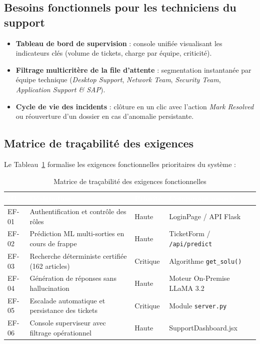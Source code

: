\documentclass[12pt, a4paper, oneside]{report}
\begin{document}
\subsection{Besoins fonctionnels pour les techniciens du support}

\begin{itemize}
  \item \textbf{Tableau de bord de supervision} : console unifiée visualisant les indicateurs clés (volume de tickets, charge par équipe, criticité).
  \item \textbf{Filtrage multicritère de la file d'attente} : segmentation instantanée par équipe technique (\textit{Desktop Support}, \textit{Network Team}, \textit{Security Team}, \textit{Application Support \& SAP}).
  \item \textbf{Cycle de vie des incidents} : clôture en un clic avec l'action \textit{Mark Resolved} ou réouverture d'un dossier en cas d'anomalie persistante.
\end{itemize}

\subsection{Matrice de traçabilité des exigences}

Le Tableau~\ref{tab:exigences} formalise les exigences fonctionnelles prioritaires du système :

\begin{table}[H]
\centering
\caption{Matrice de traçabilité des exigences fonctionnelles}
\label{tab:exigences}
\begin{tabularx}{\textwidth}{|p{1.8cm}|p{6cm}|p{2.2cm}|X|}
\hline
\rowcolor{themeDark}
\textcolor{white}{\textbf{ID}} &
\textcolor{white}{\textbf{Désignation}} &
\textcolor{white}{\textbf{Priorité}} &
\textcolor{white}{\textbf{Composant associé}} \\
\hline
EF-01 & Authentification et contrôle des rôles & Haute & LoginPage / API Flask \\
\hline
EF-02 & Prédiction ML multi-sorties en cours de frappe & Haute & TicketForm / \texttt{/api/predict} \\
\hline
EF-03 & Recherche déterministe certifiée (162 articles) & Critique & Algorithme \texttt{get\_solu()} \\
\hline
EF-04 & Génération de réponses sans hallucination & Haute & Moteur On-Premise LLaMA 3.2 \\
\hline
EF-05 & Escalade automatique et persistance des tickets & Critique & Module \texttt{server.py} \\
\hline
EF-06 & Console superviseur avec filtrage opérationnel & Haute & SupportDashboard.jsx \\
\hline
\end{tabularx}
\end{table}
\end{document}
